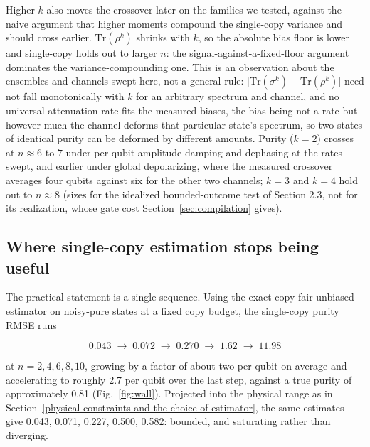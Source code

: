 \documentclass[a4paper,superscriptaddress,nofootinbib,onecolumn,nopdfoutputerror]{quantumarticle}
\begin{document}
Higher \(k\) also moves the crossover later on the families we tested, against
the naive argument that higher moments compound the single-copy variance and
should cross earlier. \(\mathrm{Tr}(\rho^k)\) shrinks with \(k\), so the
absolute bias floor is lower and single-copy holds out to larger \(n\): the
signal-against-a-fixed-floor argument dominates the variance-compounding one.
This is an observation about the ensembles and channels swept here, not a general
rule: \(\lvert \mathrm{Tr}(\sigma^k) - \mathrm{Tr}(\rho^k) \rvert\)
need not fall monotonically with \(k\) for an arbitrary spectrum and channel,
and no universal attenuation rate fits the measured biases, the bias being not a
rate but however much the channel deforms that particular state's spectrum, so
two states of identical purity can be deformed by different amounts. Purity (\(k=2\)) crosses at \(n \approx 6\) to \(7\) under per-qubit amplitude damping and
dephasing at the rates swept, and earlier under global depolarizing, where the measured crossover
averages four qubits against six for the other two channels; \(k = 3\) and \(k = 4\) hold out to
\(n \approx 8\) (sizes for the
idealized bounded-outcome test of Section 2.3, not for its realization, whose
gate cost Section~\ref{sec:compilation} gives).

\hypertarget{where-single-copy-estimation-stops-being-useful}{%
\subsection{Where single-copy estimation stops being
useful}\label{where-single-copy-estimation-stops-being-useful}}

The practical statement is a single sequence. Using the exact copy-fair
unbiased estimator on noisy-pure states at a fixed copy budget, the
single-copy purity RMSE runs

\[0.043 \;\to\; 0.072 \;\to\; 0.270 \;\to\; 1.62 \;\to\; 11.98\]

at \(n = 2, 4, 6, 8, 10\), growing by a factor of about two per qubit on
average and accelerating to roughly 2.7 per qubit over the last step,
against a true purity of approximately 0.81 (Fig.~\ref{fig:wall}).
Projected into the physical range as in
Section~\ref{physical-constraints-and-the-choice-of-estimator}, the same
estimates give 0.043, 0.071, 0.227, 0.500, 0.582: bounded, and saturating
rather than diverging.
\end{document}
